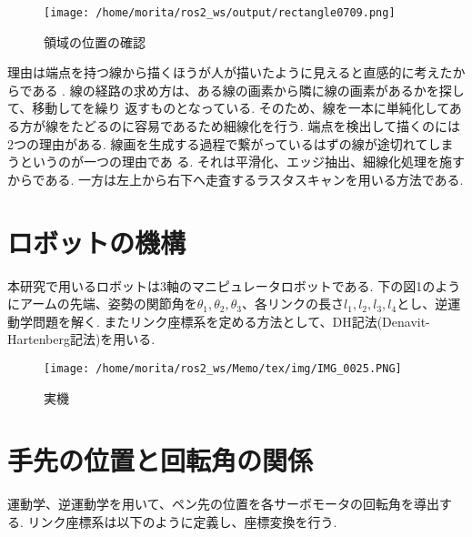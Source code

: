 \documentclass[10pt]{jarticle}
\begin{document}
    \begin{center}
        \begin{figure}[h]
            \texttt{[image: /home/morita/ros2\_ws/output/rectangle0709.png]}
            \caption{領域の位置の確認}
            \label{the position of a region}
        \end{figure}
    \end{center}

	

	理由は端点を持つ線から描くほうが人が描いたように見えると直感的に考えたからである
    .
	線の経路の求め方は、ある線の画素から隣に線の画素があるかを探して、移動してを繰り
    返すものとなっている.
	そのため、線を一本に単純化してある方が線をたどるのに容易であるため細線化を行う.
	端点を検出して描くのには2つの理由がある.
	線画を生成する過程で繋がっているはずの線が途切れてしまうというのが一つの理由であ
    る.
	それは平滑化、エッジ抽出、細線化処理を施すからである.
	一方は左上から右下へ走査するラスタスキャンを用いる方法である.

 	\section{ロボットの機構}
	本研究で用いるロボットは3軸のマニピュレータロボットである.
	下の図1のようにアームの先端、姿勢の関節角を$\theta_1, \theta_2, \theta_3$、各リンクの長さ$l_1, l_2, l_3, l_4$とし、逆運動学問題を解く.
	またリンク座標系を定める方法として、DH記法(Denavit-Hartenberg記法)を用いる.

    \begin{center}
        \begin{figure}[h]
            \texttt{[image: /home/morita/ros2\_ws/Memo/tex/img/IMG\_0025.PNG]}
            \caption{実機}
            \label{fig:sample-fig}
        \end{figure}
    \end{center}
    
	\section{手先の位置と回転角の関係}
	運動学、逆運動学を用いて、ペン先の位置を各サーボモータの回転角を導出する.
	リンク座標系は以下のように定義し、座標変換を行う.
	
\end{document}
